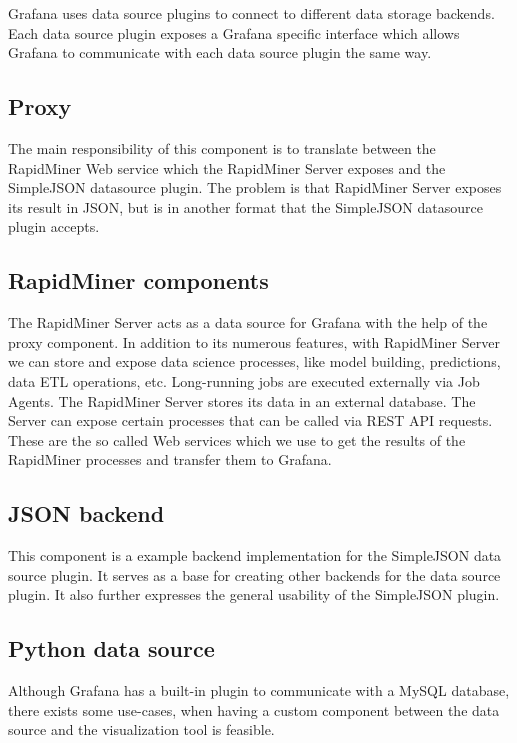 Grafana uses data source plugins to connect to different data storage backends. Each data source plugin exposes a Grafana specific interface which allows Grafana to communicate with each data source plugin the same way.


\subsection{Proxy}

The main responsibility of this component is to translate between the RapidMiner Web service which the RapidMiner Server exposes and the SimpleJSON datasource plugin. The problem is that RapidMiner Server exposes its result in JSON, but is in another format that the SimpleJSON datasource plugin accepts.

\subsection{RapidMiner components}

The RapidMiner Server acts as a data source for Grafana with the help of the proxy component. In addition to its numerous features, with RapidMiner Server we can store and expose data science processes, like model building, predictions, data ETL operations, etc. Long-running jobs are executed externally via Job Agents. The RapidMiner Server stores its data in an external database.
The Server can expose certain processes that can be called via REST API requests. These are the so called Web services which we use to get the results of the RapidMiner processes and transfer them to Grafana.

\subsection{JSON backend}
This component is a example backend implementation for the SimpleJSON data source plugin. It serves as a base for creating other backends for the data source plugin. It also further expresses the general usability of the SimpleJSON plugin.

\subsection{Python data source}

Although Grafana has a built-in plugin to communicate with a MySQL database, there exists some use-cases, when having a custom component between the data source and the visualization tool is feasible.

